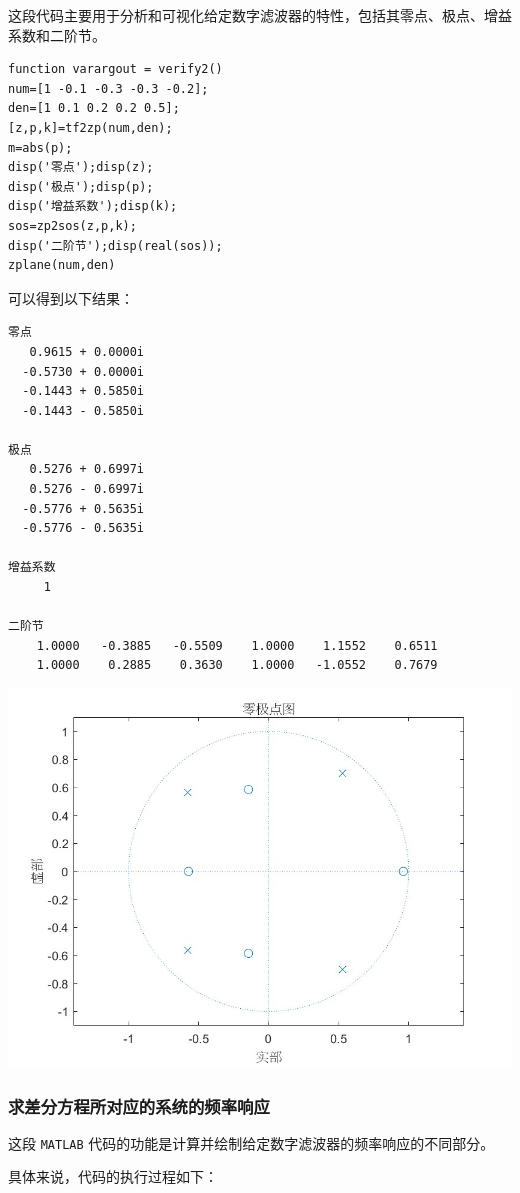 \documentclass[a4paper,12pt]{article}
\begin{document}
这段代码主要用于分析和可视化给定数字滤波器的特性，包括其零点、极点、增益系数和二阶节。

\begin{lstlisting}
function varargout = verify2()
num=[1 -0.1 -0.3 -0.3 -0.2]; 
den=[1 0.1 0.2 0.2 0.5];
[z,p,k]=tf2zp(num,den); 
m=abs(p); 
disp('零点');disp(z); 
disp('极点');disp(p); 
disp('增益系数');disp(k); 
sos=zp2sos(z,p,k); 
disp('二阶节');disp(real(sos)); 
zplane(num,den)
\end{lstlisting}

可以得到以下结果：
\begin{lstlisting}
零点
   0.9615 + 0.0000i
  -0.5730 + 0.0000i
  -0.1443 + 0.5850i
  -0.1443 - 0.5850i

极点
   0.5276 + 0.6997i
   0.5276 - 0.6997i
  -0.5776 + 0.5635i
  -0.5776 - 0.5635i

增益系数
     1

二阶节
    1.0000   -0.3885   -0.5509    1.0000    1.1552    0.6511
    1.0000    0.2885    0.3630    1.0000   -1.0552    0.7679
\end{lstlisting}

\centering 
\includegraphics[width=0.8\linewidth]{images/3_Verify/verify2.jpg}
\justifying

\subsubsection{求差分方程所对应的系统的频率响应}
这段 \texttt{MATLAB} 代码的功能是计算并绘制给定数字滤波器的频率响应的不同部分。

具体来说，代码的执行过程如下：
\end{document}
